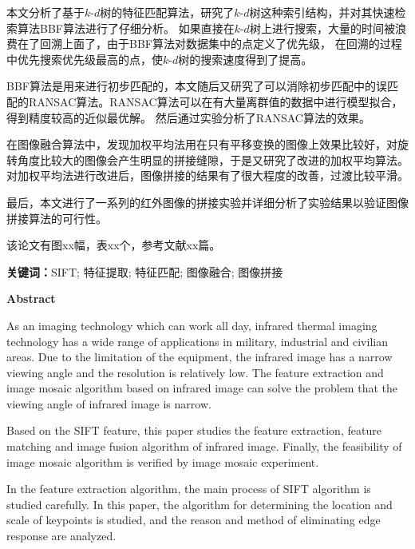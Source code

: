 \documentclass[10.5pt,a4paper]{article}
\numberwithin{equation}{section}
\numberwithin{figure}{section}
\numberwithin{table}{section}
\newcommand{\hei}{\CJKfamily{hei}}
\begin{document}
本文分析了基于$k\text{-}d$树的特征匹配算法，研究了$k\text{-}d$树这种索引结构，并对其快速检索算法BBF算法进行了仔细分析。%
如果直接在$k\text{-}d$树上进行搜索，大量的时间被浪费在了回溯上面了，由于BBF算法对数据集中的点定义了优先级，%
在回溯的过程中优先搜索优先级最高的点，使$k\text{-}d$树的搜索速度得到了提高。\par
BBF算法是用来进行初步匹配的，本文随后又研究了可以消除初步匹配中的误匹配的RANSAC算法。RANSAC算法可以在有大量离群值的数据中进行模型拟合，得到精度较高的近似最优解。%
然后通过实验分析了RANSAC算法的效果。\par
在图像融合算法中，发现加权平均法用在只有平移变换的图像上效果比较好，对旋转角度比较大的图像会产生明显的拼接缝隙，于是又研究了改进的加权平均算法。%
对加权平均法进行改进后，图像拼接的结果有了很大程度的改善，过渡比较平滑。\par
最后，本文进行了一系列的红外图像的拼接实验并详细分析了实验结果以验证图像拼接算法的可行性。
\vspace{2em}
\par
该论文有图xx幅，表xx个，参考文献xx篇。
\par
\noindent \textbf{关键词：}SIFT; 特征提取; 特征匹配; 图像融合; 图像拼接
\par
					\newpage %
{}
{\centering \hei \fontsize{18pt}{\baselineskip}\selectfont\bfseries \textsf{Abstract}\par}
\fontsize{12pt}{16pt}\selectfont
As an imaging technology which can work all day, infrared thermal imaging technology has a wide range of applications in military, industrial and civilian areas.
Due to the limitation of the equipment, the infrared image has a narrow viewing angle and the resolution is relatively low. The feature extraction and image mosaic algorithm based on infrared image can solve the problem that the viewing angle of infrared image is narrow.
\par
Based on the SIFT feature, this paper studies the feature extraction, feature matching and image fusion algorithm of infrared image. Finally, the feasibility of image mosaic algorithm is verified by image mosaic experiment.%
\par
In the feature extraction algorithm, the main process of SIFT algorithm is studied carefully.
In this paper, the algorithm for determining the location and scale of keypoints is studied, and the reason and method of eliminating edge response are analyzed.\par
\end{document}
